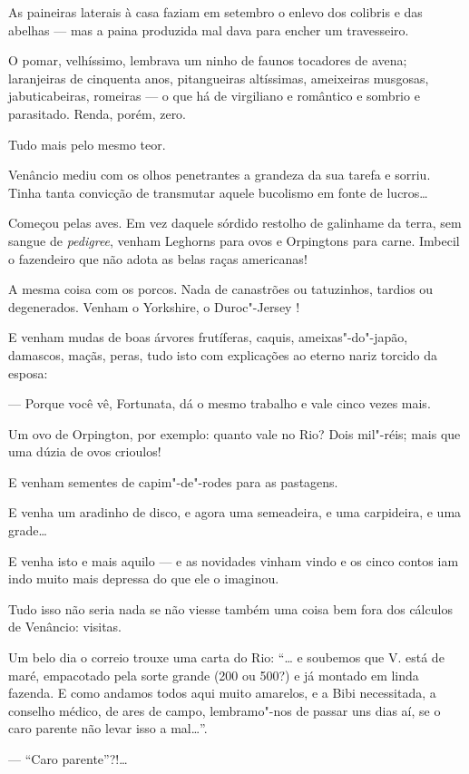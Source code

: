 As paineiras laterais à casa faziam em setembro o enlevo dos colibris e
das abelhas --- mas a paina produzida mal dava para encher um
travesseiro.

O pomar, velhíssimo, lembrava um ninho de faunos tocadores de avena;
laranjeiras de cinquenta anos, pitangueiras altíssimas, ameixeiras
musgosas, jabuticabeiras, romeiras --- o que há de virgiliano e
romântico e sombrio e parasitado. Renda, porém, zero.

Tudo mais pelo mesmo teor.

Venâncio mediu com os olhos penetrantes a grandeza da sua tarefa e
sorriu. Tinha tanta convicção de transmutar aquele bucolismo em fonte de
lucros\ldots{}

Começou pelas aves. Em vez daquele sórdido restolho de galinhame da
terra, sem sangue de \emph{pedigree}, venham Leghorns para ovos e
Orpingtons para carne. Imbecil o fazendeiro que não adota as belas raças
americanas!

A mesma coisa com os porcos. Nada de canastrões ou tatuzinhos, tardios
ou degenerados. Venham o Yorkshire, o Duroc"-Jersey !

E venham mudas de boas árvores frutíferas, caquis, ameixas"-do"-japão,
damascos, maçãs, peras, tudo isto com explicações ao eterno nariz
torcido da esposa:

--- Porque você vê, Fortunata, dá o mesmo trabalho e vale cinco vezes
mais.

Um ovo de Orpington, por exemplo: quanto vale no Rio? Dois mil"-réis;
mais que uma dúzia de ovos crioulos!

E venham sementes de capim"-de"-rodes para as pastagens.

E venha um aradinho de disco, e agora uma semeadeira, e uma carpideira,
e uma grade\ldots{}

E venha isto e mais aquilo --- e as novidades vinham vindo e os cinco
contos iam indo muito mais depressa do que ele o imaginou.

Tudo isso não seria nada se não viesse também uma coisa bem fora dos
cálculos de Venâncio: visitas.

Um belo dia o correio trouxe uma carta do Rio: ``\ldots{} e soubemos que V.
está de maré, empacotado pela sorte grande (200 ou 500?) e já montado em
linda fazenda. E como andamos todos aqui muito amarelos, e a Bibi
necessitada, a conselho médico, de ares de campo, lembramo"-nos de passar
uns dias aí, se o caro parente não levar isso a mal\ldots{}''.

--- ``Caro parente''?!\ldots{}

